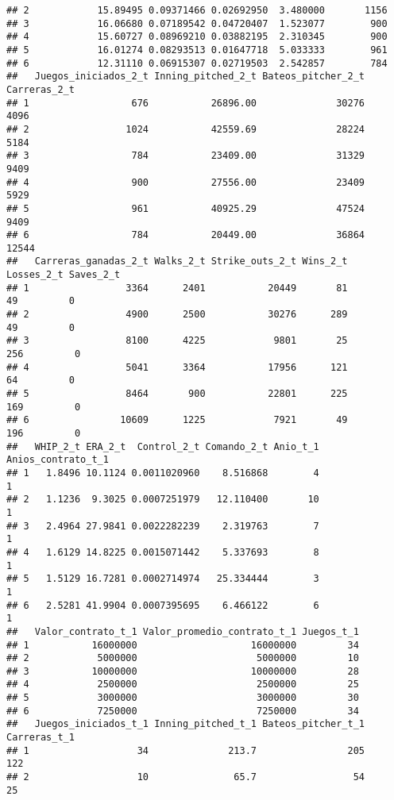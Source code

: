 \documentclass[
]{article}
\begin{document}
\begin{verbatim}
## 2            15.89495 0.09371466 0.02692950  3.480000       1156
## 3            16.06680 0.07189542 0.04720407  1.523077        900
## 4            15.60727 0.08969210 0.03882195  2.310345        900
## 5            16.01274 0.08293513 0.01647718  5.033333        961
## 6            12.31110 0.06915307 0.02719503  2.542857        784
##   Juegos_iniciados_2_t Inning_pitched_2_t Bateos_pitcher_2_t Carreras_2_t
## 1                  676           26896.00              30276         4096
## 2                 1024           42559.69              28224         5184
## 3                  784           23409.00              31329         9409
## 4                  900           27556.00              23409         5929
## 5                  961           40925.29              47524         9409
## 6                  784           20449.00              36864        12544
##   Carreras_ganadas_2_t Walks_2_t Strike_outs_2_t Wins_2_t Losses_2_t Saves_2_t
## 1                 3364      2401           20449       81         49         0
## 2                 4900      2500           30276      289         49         0
## 3                 8100      4225            9801       25        256         0
## 4                 5041      3364           17956      121         64         0
## 5                 8464       900           22801      225        169         0
## 6                10609      1225            7921       49        196         0
##   WHIP_2_t ERA_2_t  Control_2_t Comando_2_t Anio_t_1 Anios_contrato_t_1
## 1   1.8496 10.1124 0.0011020960    8.516868        4                  1
## 2   1.1236  9.3025 0.0007251979   12.110400       10                  1
## 3   2.4964 27.9841 0.0022282239    2.319763        7                  1
## 4   1.6129 14.8225 0.0015071442    5.337693        8                  1
## 5   1.5129 16.7281 0.0002714974   25.334444        3                  1
## 6   2.5281 41.9904 0.0007395695    6.466122        6                  1
##   Valor_contrato_t_1 Valor_promedio_contrato_t_1 Juegos_t_1
## 1           16000000                    16000000         34
## 2            5000000                     5000000         10
## 3           10000000                    10000000         28
## 4            2500000                     2500000         25
## 5            3000000                     3000000         30
## 6            7250000                     7250000         34
##   Juegos_iniciados_t_1 Inning_pitched_t_1 Bateos_pitcher_t_1 Carreras_t_1
## 1                   34              213.7                205          122
## 2                   10               65.7                 54           25

\end{verbatim}
\end{document}

